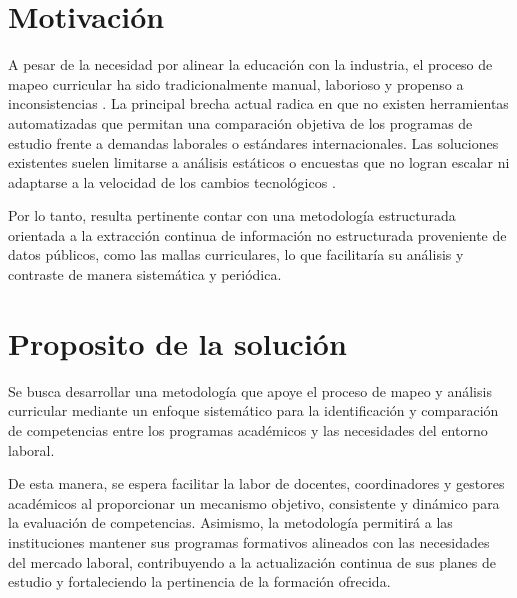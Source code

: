 \section{Motivaci\'on}
\label{intro:motivacion}
A pesar de la necesidad por alinear la educación con la industria, el proceso de mapeo curricular ha sido tradicionalmente manual, laborioso y propenso a inconsistencias \parencite{cristea_artificial_2025,russell_e_mapping_2024}.
La principal brecha actual radica en que no existen herramientas automatizadas que permitan una comparación objetiva de los programas de estudio frente a demandas laborales o estándares internacionales.
Las soluciones existentes suelen limitarse a análisis estáticos o encuestas que no logran escalar ni adaptarse a la velocidad de los cambios tecnológicos \parencite{russell_e_mapping_2024}.

Por lo tanto, resulta pertinente contar con una metodología estructurada orientada a la extracción continua de información no estructurada proveniente de datos públicos, como las mallas curriculares, lo que facilitaría su análisis y contraste de manera sistemática y periódica.
\section{Proposito de la soluci\'on}
\label{intro:proposito}
Se busca desarrollar una metodología que apoye el proceso de mapeo y análisis curricular mediante un enfoque sistemático para la identificación y comparación de competencias entre los programas académicos y las necesidades del entorno laboral.

De esta manera, se espera facilitar la labor de docentes, coordinadores y gestores académicos al proporcionar un mecanismo objetivo, consistente y dinámico para la evaluación de competencias. Asimismo, la metodología permitirá a las instituciones mantener sus programas formativos alineados con las necesidades del mercado laboral, contribuyendo a la actualización continua de sus planes de estudio y fortaleciendo la pertinencia de la formación ofrecida.